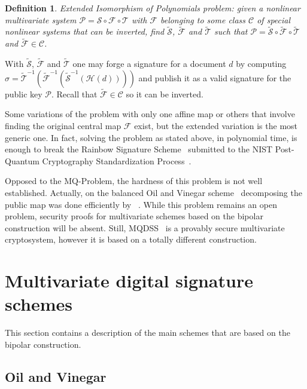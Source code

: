 \documentclass{ufsctex/ufsctex}
\newtheorem{definition}{Definition}
\begin{document}
\begin{definition}
Extended Isomorphism of Polynomials problem: given a nonlinear multivariate
system $\mathcal{P} = \mathcal{S} \circ \mathcal{F} \circ \mathcal{T}$ with
$\mathcal{F}$ belonging to some class $\mathcal{C}$ of special nonlinear
systems that can be inverted, find $\tilde{\mathcal{S}}$, $\tilde{\mathcal{F}}$
and $\tilde{\mathcal{T}}$ such that $\mathcal{P} = \tilde{\mathcal{S}} \circ
\tilde{\mathcal{F}} \circ \tilde{\mathcal{T}}$ and $\tilde{\mathcal{F}} \in
\mathcal{C}$.
\end{definition}

With $\tilde{\mathcal{S}}$, $\tilde{\mathcal{F}}$ and $\tilde{\mathcal{T}}$ one
may forge a signature for a document $d$ by computing $\sigma =
\tilde{\mathcal{T}}^{-1}(\tilde{\mathcal{F}}^{-1}(\tilde{\mathcal{S}}^{-1}(
\mathcal{H}(d))))$ and publish it as a valid signature for the public key
$\mathcal{P}$. Recall that $\tilde{\mathcal{F}} \in \mathcal{C}$ so it can be
inverted.

Some variations of the problem with only one affine map or others that
involve finding the original central map $\mathcal{F}$ exist, but the extended
variation is the most generic one. In fact, solving the problem as stated
above, in polynomial time, is enough to break the Rainbow Signature
Scheme~\cite{ding2005rainbow} submitted to the NIST Post-Quantum Cryptography
Standardization Process~\cite{ding2017nist}.

Opposed to the MQ-Problem, the hardness of this problem is not well
established. Actually, on the balanced Oil and Vinegar
scheme~\cite{patarin1997ov} decomposing the public map was done efficiently by
~\cite{kipnis1998cryptanalysis}. While this problem remains an open problem,
security proofs for multivariate schemes based on the bipolar construction will
be absent. Still, MQDSS~\cite{chen20165} is a provably secure multivariate cryptosystem,
however it is based on a totally different construction.

\section{Multivariate digital signature schemes}\label{sec:mqschemes}

This section contains a description of the main schemes that are based on the
bipolar construction.

\subsection{Oil and Vinegar}\label{sec:ov}
\end{document}
